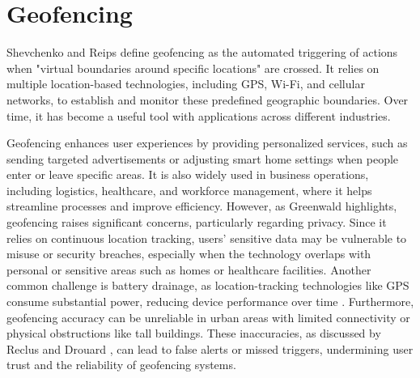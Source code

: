 
\section{Geofencing}
Shevchenko and Reips \cite{shevchenko2024geofencing} define geofencing as the automated triggering of actions when "virtual boundaries around specific locations" are crossed. It relies on multiple location-based technologies, including GPS, Wi-Fi, and cellular networks, to establish and monitor these predefined geographic boundaries. Over time, it has become a useful tool with applications across different industries.

Geofencing enhances user experiences by providing personalized services, such as sending targeted advertisements or adjusting smart home settings when people enter or leave specific areas. It is also widely used in business operations, including logistics, healthcare, and workforce management, where it helps streamline processes and improve efficiency. However, as Greenwald \cite{greenwald2011geofencing} highlights, geofencing raises significant concerns, particularly regarding privacy. Since it relies on continuous location tracking, users’ sensitive data may be vulnerable to misuse or security breaches, especially when the technology overlaps with personal or sensitive areas such as homes or healthcare facilities.
Another common challenge is battery drainage, as location-tracking technologies like GPS consume substantial power, reducing device performance over time \cite{amudha2019smarthome}. Furthermore, geofencing accuracy can be unreliable in urban areas with limited connectivity or physical obstructions like tall buildings. These inaccuracies, as discussed by Reclus and Drouard \cite{reclus2009fleet}, can lead to false alerts or missed triggers, undermining user trust and the reliability of geofencing systems.

